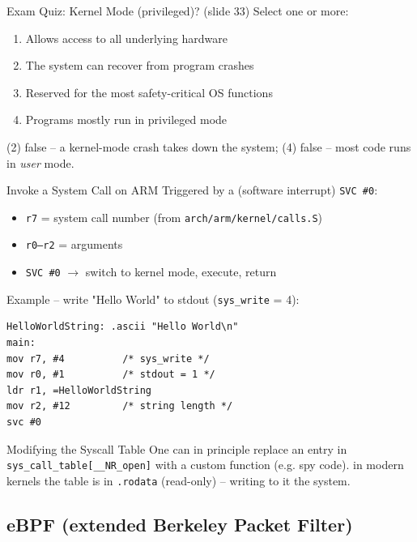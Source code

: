 \begin{example2}{Exam Quiz: Kernel Mode (privileged)? (slide 33)}
    Select one or more:
    \begin{enumerate}
        \item Allows access to all underlying hardware
        \item The system can recover from program crashes
        \item Reserved for the most safety-critical OS functions
        \item Programs mostly run in privileged mode
    \end{enumerate}
    \tcblower
    (2) false -- a kernel-mode crash takes down the system; (4) false -- most code
    runs in \emph{user} mode.
\end{example2}

\begin{KR}{Invoke a System Call on ARM}
    Triggered by a  (software interrupt) \texttt{SVC \#0}:
    \begin{itemize}
        \item \texttt{r7} = system call number (from \texttt{arch/arm/kernel/calls.S})
        \item \texttt{r0--r2} = arguments
        \item \texttt{SVC \#0} $\to$ switch to kernel mode, execute, return
    \end{itemize}
    Example -- write "Hello World" to stdout (\texttt{sys\_write} = 4):
\begin{lstlisting}[style=basesmol, aboveskip=2pt, belowskip=2pt]
HelloWorldString: .ascii "Hello World\n"
main:
mov r7, #4          /* sys_write */
mov r0, #1          /* stdout = 1 */
ldr r1, =HelloWorldString
mov r2, #12         /* string length */
svc #0
\end{lstlisting}
\end{KR}

\begin{remark2}{Modifying the Syscall Table}
    One can in principle replace an entry in \texttt{sys\_call\_table[\_\_NR\_open]}
    with a custom function (e.g. spy code).  in modern kernels the
    table is in \texttt{.rodata} (read-only) -- writing to it  the system.
\end{remark2}

\raggedcolumns
\columnbreak


\subsection{eBPF (extended Berkeley Packet Filter)}

